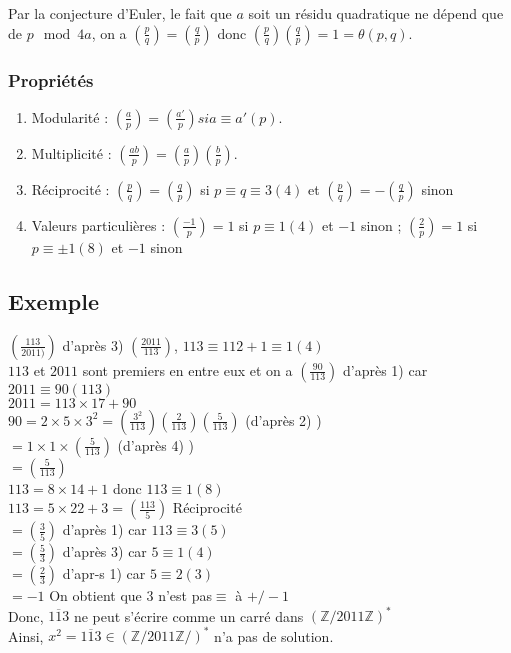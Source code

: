 \documentclass[a4paper,10pt]{book} %
\newcommand{\Z}{\mathbb{Z}}
\newcommand{\legendre}[2]{\left(\frac{#1}{#2}\right)}
\begin{document}
Par la conjecture d'Euler, le fait que $a$ soit un résidu quadratique ne dépend que de $p\mod 4a$, on a $\legendre{p}{q}=\legendre{q}{p}$ donc $\legendre{p}{q}\legendre{q}{p} =1=\theta(p,q)$.

\subsubsection{Propriétés}
\begin{enumerate}
\item Modularité : $\legendre{a}{p}=\legendre{a'}{p} si a\equiv a'(p)$.
\item Multiplicité : $\legendre{ab}{p}=\legendre{a}{p}\legendre{b}{p}$.
\item Réciprocité : $\legendre{p}{q}=\legendre{q}{p}$ si $p\equiv q\equiv 3(4)$ et $\legendre{p}{q}=-\legendre{q}{p}$ sinon
\item Valeurs particulières : $\legendre{-1}{p}= 1$ si $p\equiv 1(4)$ et $-1$ sinon ; $\legendre{2}{p}=1$ si $p\equiv \pm 1(8)$ et $-1$ sinon
\end{enumerate}

\subsection*{Exemple}
$(\frac{113}{2011)})$ d'après 3) $(\frac{2011}{113})$, $113 \equiv 112+1 \equiv 1 (4)$\\
$113$ et $2011$ sont premiers en entre eux et on a $(\frac{90}{113})$ d'après 1) car $2011 \equiv 90(113)$\\
$2011=113\times 17+90$\\
$90=2\times 5\times 3^2 = (\frac{3^2}{113})(\frac{2}{113})(\frac{5}{113})$ (d'après 2) )\\
$= 1\times 1\times (\frac{5}{113})$ (d'après 4) )\\
$=(\frac{5}{113})$\\
$113=8\times 14+1$ donc $113\equiv 1(8)$\\ 
$113=5\times 22+3=(\frac{113}{5})$ Réciprocité \\
$=(\frac{3}{5})$ d'après 1) car $113\equiv 3(5)$\\
$=(\frac{5}{3})$ d'après 3) car $5\equiv 1(4)$\\
$=(\frac{2}{3})$ d'apr-s 1) car $5\equiv 2(3)$\\
$=-1$ On obtient que $3$ n'est pas$\equiv$ à $+/- 1$\\
Donc, $\overline{113}$ ne peut s'écrire comme un carré dans $(\Z/2011\Z)^*$\\
Ainsi, $x^2=\overline{113} \in (\Z/2011\Z/)^*$ n'a pas de solution.\\
\end{document}
